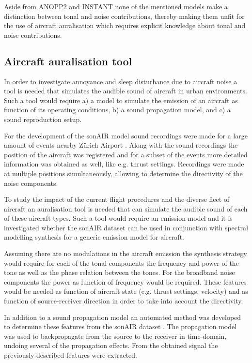 \documentclass[10pt,twocolumn]{article}
\begin{document}
Aside from ANOPP2 and INSTANT none of the mentioned models make a distinction
between tonal and noise contributions, thereby making them unfit for the use of
aircraft auralisation which requires explicit knowledge about tonal and noise
contributions.

\subsection{Aircraft auralisation tool}
In order to investigate annoyance and sleep disturbance due to aircraft noise
a tool is needed that simulates the audible sound of aircraft in urban
environments. Such a tool would require a) a model to simulate the emission of an
aircraft as function of its operating conditions, b) a sound propagation model,
and c) a sound reproduction setup.

For the development of the sonAIR model \cite{Zellmann2016} sound recordings
were made for a large amount of events nearby Z\"{u}rich Airport
\cite{Zellmann2013}. Along with the sound recordings the position of the
aircraft was registered and for a subset of the events more detailed information
was obtained as well, like e.g. thrust settings. Recordings were made at
multiple positions simultaneously, allowing to determine the directivity of the
noise components.

To study the impact of the current flight procedures and the diverse fleet of
aircraft an auralisation tool is needed that can simulate the audible sound
of each of these aircraft types. Such a tool would require an emission model and
it is investigated whether the sonAIR dataset can be used in conjunction with
spectral modelling synthesis for a generic emission model for aircraft.

Assuming there are no modulations in the aircraft emission the synthesis
strategy would require for each of the tonal components the frequency and power
of the tone as well as the phase relation between the tones. For the broadband
noise components the power as function of frequency would be required. These
features would be needed as function of aircraft state (e.g. thrust settings,
velocity) and as function of source-receiver direction in order to take into
account the directivity.

In addition to a sound propagation model an automated method was
developed to determine these features from the sonAIR dataset
\cite{Rietdijk2015}. The propagation model was used to backpropagate from the
source to the receiver in time-domain, undoing several of the propagation
effects. From the obtained signal the previously described features were
extracted.
\end{document}
